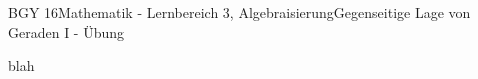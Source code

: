 \documentclass[oneside,openany,headings=optiontotoc,11pt,numbers=noenddot]{scrreprt}
\begin{document}
	\begin{worksheet}{BGY 16}{Mathematik - Lernbereich 3, Algebraisierung}{Gegenseitige Lage von Geraden I - Übung}
				
		\begin{framed}
			blah
		\end{framed}
	\end{worksheet}
\end{document}
